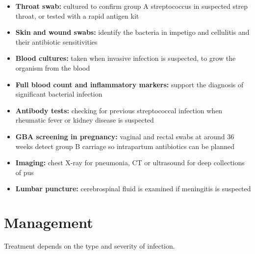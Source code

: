 \begin{itemize}
    \item \textbf{Throat swab:} cultured to confirm group A streptococcus in suspected strep throat, or tested with a rapid antigen kit
    \item \textbf{Skin and wound swabs:} identify the bacteria in impetigo and cellulitis and their antibiotic sensitivities
    \item \textbf{Blood cultures:} taken when invasive infection is suspected, to grow the organism from the blood
    \item \textbf{Full blood count and inflammatory markers:} support the diagnosis of significant bacterial infection
    \item \textbf{Antibody tests:} checking for previous streptococcal infection when rheumatic fever or kidney disease is suspected
    \item \textbf{GBA screening in pregnancy:} vaginal and rectal swabs at around 36 weeks detect group B carriage so intrapartum antibiotics can be planned
    \item \textbf{Imaging:} chest X-ray for pneumonia, CT or ultrasound for deep collections of pus
    \item \textbf{Lumbar puncture:} cerebrospinal fluid is examined if meningitis is suspected
\end{itemize}

\section*{Management}
Treatment depends on the type and severity of infection.

